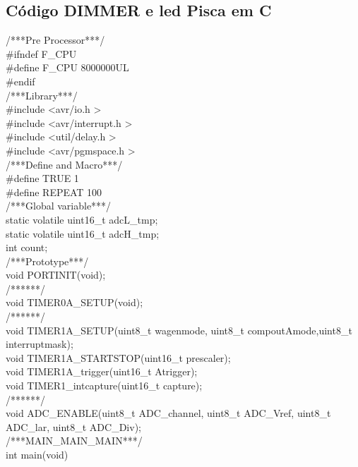\documentclass[titlepage, a4paper, 10pt, reqno, openany]{report}
\begin{document}

\subsection {C\'{o}digo DIMMER e led Pisca em C}
\begin{minipage}[t]{.35\linewidth} 
	\tiny
	/***Pre Processor***/ \\
	\#ifndef F\_CPU \\
	\hspace*{.5cm}	\#define F\_CPU 8000000UL \\
	\#endif \\
	/***Library***/ \\
	\#include \textless avr/io.h \textgreater \\
	\#include \textless avr/interrupt.h \textgreater \\
	\#include \textless util/delay.h \textgreater \\
	\#include \textless avr/pgmspace.h \textgreater \\
	/***Define and Macro***/ \\
	\#define TRUE 1 \\
	\#define REPEAT 100 \\
	/***Global variable***/ \\
	static volatile uint16\_t adcL\_tmp; \\
	static volatile uint16\_t adcH\_tmp; \\
	int count; \\
	/***Prototype***/ \\
	void PORTINIT(void); \\
	/******/ \\
	void TIMER0A\_SETUP(void); \\
	/******/ \\
	void TIMER1A\_SETUP(uint8\_t wagenmode, uint8\_t compoutAmode,uint8\_t interruptmask); \\
	void TIMER1A\_STARTSTOP(uint16\_t prescaler); \\
	void TIMER1A\_trigger(uint16\_t Atrigger); \\
	void TIMER1\_intcapture(uint16\_t capture); \\
	/******/ \\
	void ADC\_ENABLE(uint8\_t ADC\_channel, uint8\_t ADC\_Vref, uint8\_t ADC\_lar, uint8\_t ADC\_Div); \\
	/***MAIN\_MAIN\_MAIN***/ \\
	int main(void) \\
	\textbraceleft \\

\end{minipage}
\end{document}
